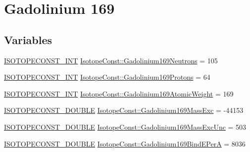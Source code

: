 \hypertarget{group___isotope_const-_gadolinium-_gd169}{}\section{Gadolinium 169}
\label{group___isotope_const-_gadolinium-_gd169}
\subsection*{Variables}
\begin{DoxyCompactItemize}
\item 
\mbox{\hyperlink{group___isotope_const-_macros_ga5f18360b3e99483a35c32d789e62621c}{I\+S\+O\+T\+O\+P\+E\+C\+O\+N\+S\+T\+\_\+\+I\+NT}} \mbox{\hyperlink{group___isotope_const-_gadolinium-_gd169_ga88bf5a2d833782f02ba38f13ab82e3db}{Isotope\+Const\+::\+Gadolinium169\+Neutrons}} = 105
\item 
\mbox{\hyperlink{group___isotope_const-_macros_ga5f18360b3e99483a35c32d789e62621c}{I\+S\+O\+T\+O\+P\+E\+C\+O\+N\+S\+T\+\_\+\+I\+NT}} \mbox{\hyperlink{group___isotope_const-_gadolinium-_gd169_ga2f00e4ff001858b8e5179f348ae09af0}{Isotope\+Const\+::\+Gadolinium169\+Protons}} = 64
\item 
\mbox{\hyperlink{group___isotope_const-_macros_ga5f18360b3e99483a35c32d789e62621c}{I\+S\+O\+T\+O\+P\+E\+C\+O\+N\+S\+T\+\_\+\+I\+NT}} \mbox{\hyperlink{group___isotope_const-_gadolinium-_gd169_gad301768d4ce27114f0ce6ccbfe6770c4}{Isotope\+Const\+::\+Gadolinium169\+Atomic\+Weight}} = 169
\item 
\mbox{\hyperlink{group___isotope_const-_macros_ga8f45a7272ce02c0b4c65c44636ed719a}{I\+S\+O\+T\+O\+P\+E\+C\+O\+N\+S\+T\+\_\+\+D\+O\+U\+B\+LE}} \mbox{\hyperlink{group___isotope_const-_gadolinium-_gd169_ga07522909e7896eb0c7036152b3eb91a9}{Isotope\+Const\+::\+Gadolinium169\+Mass\+Exc}} = -\/44153
\item 
\mbox{\hyperlink{group___isotope_const-_macros_ga8f45a7272ce02c0b4c65c44636ed719a}{I\+S\+O\+T\+O\+P\+E\+C\+O\+N\+S\+T\+\_\+\+D\+O\+U\+B\+LE}} \mbox{\hyperlink{group___isotope_const-_gadolinium-_gd169_gaf4e45c13e2884207a91272597e4751c0}{Isotope\+Const\+::\+Gadolinium169\+Mass\+Exc\+Unc}} = 503
\item 
\mbox{\hyperlink{group___isotope_const-_macros_ga8f45a7272ce02c0b4c65c44636ed719a}{I\+S\+O\+T\+O\+P\+E\+C\+O\+N\+S\+T\+\_\+\+D\+O\+U\+B\+LE}} \mbox{\hyperlink{group___isotope_const-_gadolinium-_gd169_ga029060c1ad5f5a728059bc65265a05a9}{Isotope\+Const\+::\+Gadolinium169\+Bind\+E\+PerA}} = 8036
\item 

\end{DoxyCompactItemize}
